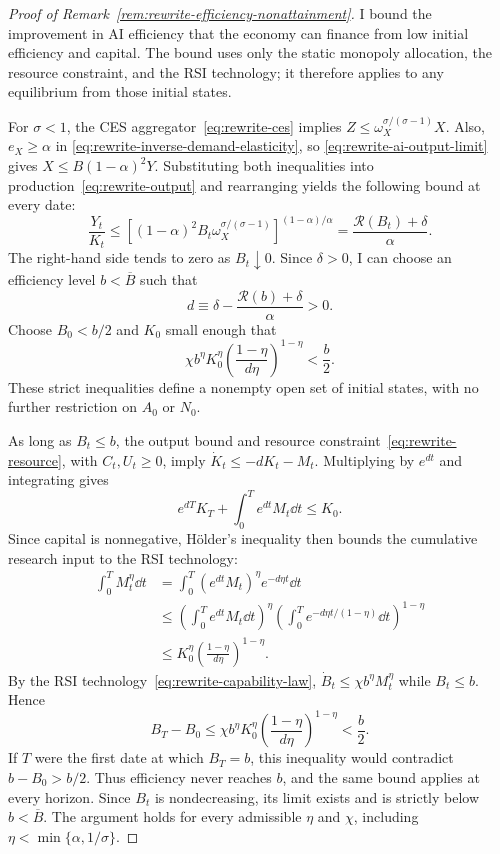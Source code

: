 \label{proof:rewrite-efficiency-nonattainment}
\begin{proof}[Proof of Remark~\ref{rem:rewrite-efficiency-nonattainment}]
I bound the improvement in AI efficiency that the economy can finance
from low initial efficiency and capital. The bound uses only the static
monopoly allocation, the resource constraint, and the RSI technology;
it therefore applies to any equilibrium from those initial states.

For $\sigma<1$, the CES aggregator~\eqref{eq:rewrite-ces} implies
$Z\leq\omega_X^{\sigma/(\sigma-1)}X$.
Also, $e_X\geq\alpha$ in
\eqref{eq:rewrite-inverse-demand-elasticity}, so
\eqref{eq:rewrite-ai-output-limit} gives
$X\leq B(1-\alpha)^2Y$.
Substituting both inequalities into production~\eqref{eq:rewrite-output}
and rearranging yields the following bound at every date:
\[
 \frac{Y_t}{K_t}
 \leq\left[(1-\alpha)^2B_t
 \omega_X^{\sigma/(\sigma-1)}\right]^{(1-\alpha)/\alpha}
 =\frac{\mathcal R(B_t)+\delta}{\alpha}.
\]
The right-hand side tends to zero as $B_t\downarrow0$. Since $\delta>0$,
I can choose an efficiency level $b<\overline B$ such that
\[
 d\equiv\delta-\frac{\mathcal R(b)+\delta}{\alpha}>0.
\]
Choose $B_0<b/2$ and $K_0$ small enough that
\[
 \chi b^\eta K_0^\eta
 \left(\frac{1-\eta}{d\eta}\right)^{1-\eta}<\frac b2.
\]
These strict inequalities define a nonempty open set of initial states,
with no further restriction on $A_0$ or $N_0$.

As long as $B_t\leq b$, the output bound and
resource constraint~\eqref{eq:rewrite-resource}, with $C_t,U_t\geq0$, imply
$\dot K_t\leq-dK_t-M_t$.
Multiplying by $e^{dt}$ and integrating gives
\[
 e^{dT}K_T+\int_0^T e^{dt}M_t\dd t\leq K_0.
\]
Since capital is nonnegative, H\"older's inequality then bounds the
cumulative research input to the RSI technology:
\[
 \begin{aligned}
 \int_0^T M_t^\eta\dd t
 &=\int_0^T(e^{dt}M_t)^\eta e^{-d\eta t}\dd t\\
 &\leq\left(\int_0^T e^{dt}M_t\dd t\right)^\eta
 \left(\int_0^T e^{-d\eta t/(1-\eta)}\dd t\right)^{1-\eta}\\
 &\leq K_0^\eta\left(\frac{1-\eta}{d\eta}\right)^{1-\eta}.
 \end{aligned}
\]
By the RSI technology~\eqref{eq:rewrite-capability-law},
$\dot B_t\leq\chi b^\eta M_t^\eta$ while $B_t\leq b$. Hence
\[
 B_T-B_0\leq\chi b^\eta K_0^\eta
 \left(\frac{1-\eta}{d\eta}\right)^{1-\eta}<\frac b2.
\]
If $T$ were the first date at which $B_T=b$, this inequality would
contradict $b-B_0>b/2$. Thus efficiency never reaches $b$, and the same
bound applies at every horizon. Since $B_t$ is nondecreasing, its limit
exists and is strictly below $b<\overline B$.
The argument holds for every admissible $\eta$ and $\chi$, including
$\eta<\min\{\alpha,1/\sigma\}$.
\end{proof}


